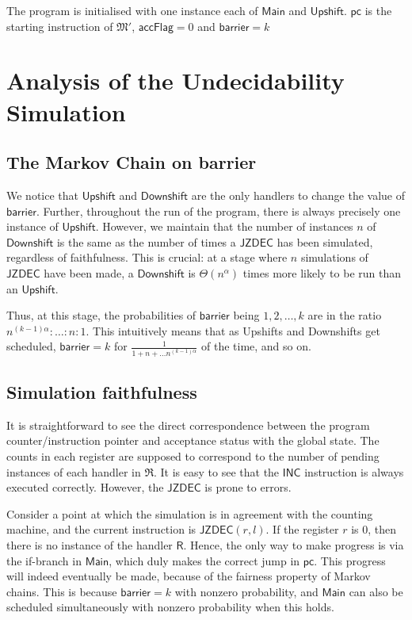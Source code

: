 \documentclass{article}
\theoremstyle{remark}
\newcommand{\machine}{\mathfrak{M}}
\newcommand{\inc}{\mathsf{INC}}
\newcommand{\jzdec}{\mathsf{JZDEC}}
\newcommand{\pc}{\mathsf{pc}}
\newcommand{\main}{\mathsf{Main}}
\newcommand{\accflag}{\mathsf{accFlag}}
\newcommand{\barrier}{\mathsf{barrier}}
\newcommand{\upshift}{\mathsf{Upshift}}
\newcommand{\downshift}{\mathsf{Downshift}}
\begin{document}
The program is initialised with one instance each of $\main$ and $\upshift$. $\pc$ is the starting instruction of $\machine'$, $\accflag= 0$ and $\barrier = k$

\section{Analysis of the Undecidability Simulation}
\subsection{The Markov Chain on barrier}
We notice that $\upshift$ and $\downshift$ are the only handlers to change the value of $\barrier$. Further, throughout the run of the program, there is always precisely one instance of $\upshift$. However, we maintain that the number of instances $n$ of $\downshift$ is the same as the number of times a $\jzdec$ has been simulated, regardless of faithfulness. This is crucial: at a stage where $n$ simulations of $\jzdec$ have been made, a $\downshift$ is $\Theta(n^\alpha)$ times more likely to be run than an $\upshift$.

Thus, at this stage, the probabilities of $\barrier$ being $1, 2, \dots, k$ are in the ratio $n^{(k-1)\alpha}: \dots:  n: 1$. This intuitively means that as Upshifts and Downshifts get scheduled, $\barrier = k$ for $\frac{1}{1+n+ \dots n^{(k-1)\alpha}}$ of the time, and so on. 

\subsection{Simulation faithfulness}
It is straightforward to see the direct correspondence between the program counter/instruction pointer and acceptance status with the global state. The counts in each register are supposed to correspond to the number of pending instances of each handler in $\mathfrak{R}$. It is easy to see that the $\inc$ instruction is always executed correctly. However, the $\jzdec$ is prone to errors. 

Consider a point at which the simulation is in agreement with the counting machine, and the current instruction is $\jzdec(r, l)$. If the register $r$ is $0$, then there is no instance of the handler $\mathsf{R}$. Hence, the only way to make progress is via the if-branch in $\main$, which duly makes the correct jump in $\pc$. This progress will indeed eventually be made, because of the fairness property of Markov chains. This is because $\barrier = k$ with nonzero probability, and $\main$ can also be scheduled simultaneously with nonzero probability when this holds. 
\end{document}
